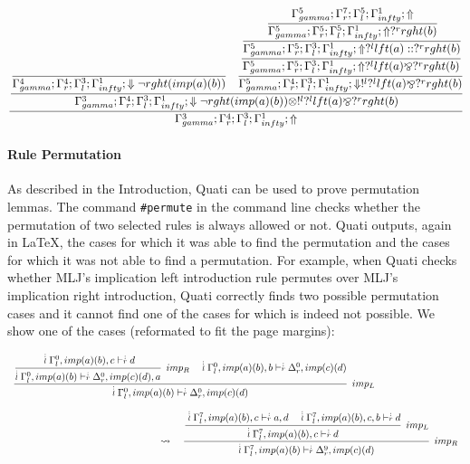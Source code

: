 \documentclass{llncs}
\newcommand{\ndots}[1]{\stackrel{\vcenter{\hbox{$\scriptstyle :$}\vskip-.35ex}}
   {\hbox {$ \scriptstyle {#1}$}}}
\begin{document}
{\scriptsize\[\cfrac{\cfrac{\cfrac{}
{\Gamma_{ gamma}^{4} ; \Gamma_{r}^{4} ; \Gamma_{l}^{3} ; \Gamma_{ infty}^{1} ;  \Downarrow \neg rght (imp (a) (b) )  } \quad \cfrac{\cfrac{\cfrac{\cfrac{\Gamma_{ gamma}^{5} ; \Gamma_{r}^{7} ; \Gamma_{l}^{5} ; \Gamma_{ infty}^{1} ;  \Uparrow }
{\Gamma_{ gamma}^{5} ; \Gamma_{r}^{5} ; \Gamma_{l}^{5} ; \Gamma_{ infty}^{1} ;  \Uparrow  ?^{r} rght (b)  }}
{\Gamma_{ gamma}^{5} ; \Gamma_{r}^{5} ; \Gamma_{l}^{3} ; \Gamma_{ infty}^{1} ;  \Uparrow  ?^{l} lft (a)  ::  ?^{r} rght (b) }}
{\Gamma_{ gamma}^{5} ; \Gamma_{r}^{5} ; \Gamma_{l}^{3} ; \Gamma_{ infty}^{1} ;  \Uparrow  ?^{l} lft (a)  \bindnasrepma  ?^{r} rght (b)  }}
{\Gamma_{ gamma}^{5} ; \Gamma_{r}^{4} ; \Gamma_{l}^{3} ; \Gamma_{ infty}^{1} ;  \Downarrow  !^{l}  ?^{l} lft (a)  \bindnasrepma  ?^{r} rght (b)  }}
{\Gamma_{ gamma}^{3} ; \Gamma_{r}^{4} ; \Gamma_{l}^{3} ; \Gamma_{ infty}^{1} ;  \Downarrow \neg rght (imp (a) (b) )  \otimes  !^{l}  ?^{l} lft (a)  \bindnasrepma  ?^{r} rght (b) }}
{\Gamma_{ gamma}^{3} ; \Gamma_{r}^{4} ; \Gamma_{l}^{3} ; \Gamma_{ infty}^{1} ; \Uparrow }\]}


\vspace{-2mm}

\paragraph{Rule Permutation}
As described in the Introduction, Quati can be used to prove permutation lemmas. The command \texttt{\#permute} in the command 
line checks whether the permutation of two selected rules is always allowed or not. Quati outputs, again in \LaTeX, the cases for
which it was able to find the permutation and the cases for which it was not able to find a permutation. For example, when Quati 
checks whether MLJ's implication left introduction rule permutes over MLJ's implication right introduction, Quati correctly finds two possible
permutation cases and it cannot find one of the cases for which is indeed not possible. We show one of the cases (reformated to fit the page margins):
\vspace{-3mm}

{\scriptsize
\[
\begin{array}{ll}
\cfrac{\cfrac{ \ndots{l} \Gamma_{l}^{0}, imp (a) (b) , c \vdash  \ndots{r} d}
{ \ndots{l} \Gamma_{l}^{0}, imp (a) (b)  \vdash  \ndots{r} \Delta_{r}^{0}, imp (c) (d) , a} \;\; imp_{R}
\quad
 \ndots{l} \Gamma_{l}^{0}, imp (a) (b) , b \vdash  \ndots{r} \Delta_{r}^{0}, imp (c) (d) }
{ \ndots{l} \Gamma_{l}^{0}, imp (a) (b)  \vdash  \ndots{r} \Delta_{r}^{0}, imp (c) (d) } \;\; imp_{L}\\\\
\qquad \qquad \qquad \qquad \qquad \qquad \qquad \quad\rightsquigarrow\quad
\cfrac{\cfrac{ \ndots{l} \Gamma_{l}^{7}, imp (a) (b) , c \vdash  \ndots{r} a, d
\quad
 \ndots{l} \Gamma_{l}^{7}, imp (a) (b) , c, b \vdash  \ndots{r} d}
{ \ndots{l} \Gamma_{l}^{7}, imp (a) (b) , c \vdash  \ndots{r} d} \;\; imp_{L}}
{ \ndots{l} \Gamma_{l}^{7}, imp (a) (b)  \vdash  \ndots{r} \Delta_{r}^{9}, imp (c) (d) } \;\; imp_{R}
\end{array}
\]
}
\end{document}
